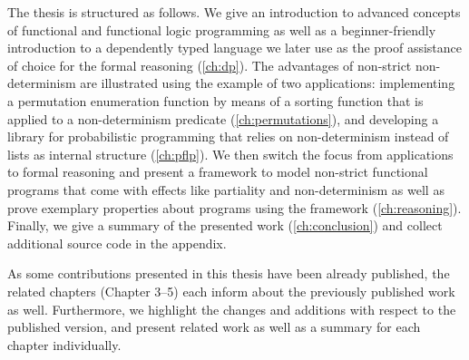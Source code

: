 The thesis is structured as follows. We give an introduction to advanced concepts of functional and functional logic programming as well as a beginner\--friendly introduction to a dependently typed language we later use as the proof assistance of choice for the formal reasoning (\autoref{ch:dp}).
The advantages of non\--strict non\--determinism are illustrated using the example of two applications: implementing a permutation enumeration function by means of a sorting function that is applied to a non\--determinism predicate (\autoref{ch:permutations}), and developing a library for probabilistic programming that relies on non\--determinism instead of lists as internal structure (\autoref{ch:pflp}).
We then switch the focus from applications to formal reasoning and present a framework to model non\--strict functional programs that come with effects like partiality and non\--determinism as well as prove exemplary properties about programs using the framework (\autoref{ch:reasoning}).
Finally, we give a summary of the presented work (\autoref{ch:conclusion}) and collect additional source code in the appendix.

As some contributions presented in this thesis have been already published, the related chapters (Chapter 3--5) each inform about the previously published work as well.
Furthermore, we highlight the changes and additions with respect to the published version, and present related work as well as a summary for each chapter individually.